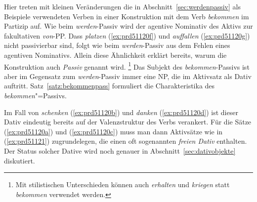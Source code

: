 \begin{exe}
  \ex\label{ex:prd51120} 
  \begin{xlist}
  \end{xlist}
\end{exe}

Hier treten mit kleinen Veränderungen die in Abschnitt~\ref{sec:werdenpassiv} als Beispiele verwendeten Verben in einer Konstruktion mit dem Verb \textit{bekommen} im Partizip auf.
Wie beim \textit{werden}-Passiv wird der agentive Nominativ des Aktivs zur fakultativen \textit{von}-PP.
Dass \textit{platzen} (\ref{ex:prd51120f}) und \textit{auffallen} (\ref{ex:prd51120g}) nicht passivierbar sind, folgt wie beim \textit{werden}-Passiv aus dem Fehlen eines agentiven Nominativs.
Allein diese Ähnlichkeit erklärt bereits, warum die Konstruktion auch \textit{Passiv} genannt wird.%
\footnote{Mit stilistischen Unterschieden können auch \textit{erhalten} und \textit{kriegen} statt \textit{bekommen} verwendet werden.}
Das Subjekt des \textit{bekommen}-Passivs ist aber im Gegensatz zum \textit{werden}-Passiv immer eine NP, die im Aktivsatz als Dativ auftritt.
Satz~\ref{satz:bekommenpass} formuliert die Charakteristika des \textit{bekommen}"=Passivs.


Im Fall von \textit{schenken} (\ref{ex:prd51120b}) und \textit{danken} (\ref{ex:prd51120d}) ist dieser Dativ eindeutig bereits auf der Valenzstruktur des Verbs verankert.
Für die Sätze (\ref{ex:prd51120a}) und (\ref{ex:prd51120c}) muss man dann Aktivsätze wie in (\ref{ex:prd51121}) zugrundelegen, die einen oft sogenannten \textit{freien Dativ} enthalten.
Der Status solcher Dative wird noch genauer in Abschnitt~\ref{sec:dativobjekte} diskutiert.


